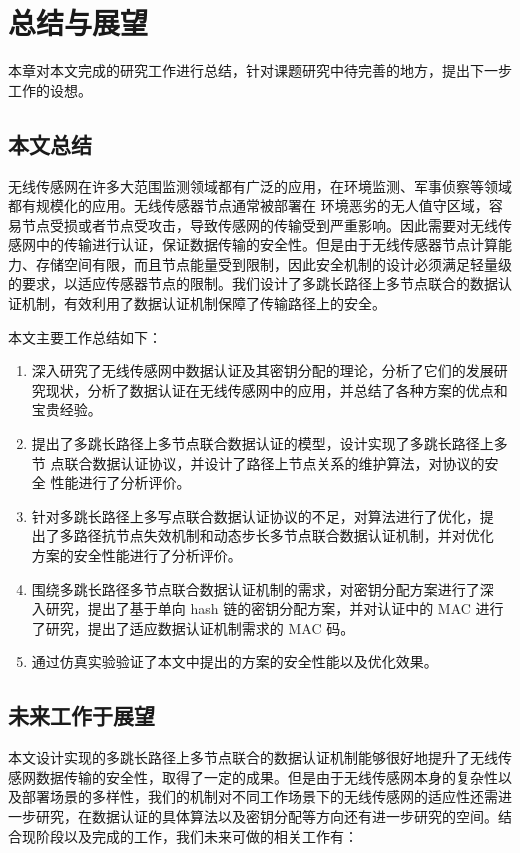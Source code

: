 \chapter{总结与展望}
本章对本文完成的研究工作进行总结，针对课题研究中待完善的地方，提出下一步工作的设想。
\section{本文总结}
无线传感网在许多大范围监测领域都有广泛的应用，在环境监测、军事侦察等领域都有规模化的应用。无线传感器节点通常被部署在
环境恶劣的无人值守区域，容易节点受损或者节点受攻击，导致传感网的传输受到严重影响。因此需要对无线传感网中的传输进行认证，保证数据传输的安全性。但是由于无线传感器节点计算能力、存储空间有限，而且节点能量受到限制，因此安全机制的设计必须满足轻量级的要求，以适应传感器节点的限制。我们设计了多跳长路径上多节点联合的数据认证机制，有效利用了数据认证机制保障了传输路径上的安全。

本文主要工作总结如下：
\begin{enumerate}\setlength{\itemsep}{-\itemsep}
  \item 深入研究了无线传感网中数据认证及其密钥分配的理论，分析了它们的发展研究现状，分析了数据认证在无线传感网中的应用，并总结了各种方案的优点和宝贵经验。
  \item 提出了多跳长路径上多节点联合数据认证的模型，设计实现了多跳长路径上多节
        点联合数据认证协议，并设计了路径上节点关系的维护算法，对协议的安全
        性能进行了分析评价。
  \item 针对多跳长路径上多写点联合数据认证协议的不足，对算法进行了优化，提
        出了多路径抗节点失效机制和动态步长多节点联合数据认证机制，并对优化
        方案的安全性能进行了分析评价。
  \item 围绕多跳长路径多节点联合数据认证机制的需求，对密钥分配方案进行了深
        入研究，提出了基于单向 hash 链的密钥分配方案，并对认证中的 MAC 进行
        了研究，提出了适应数据认证机制需求的 MAC 码。
  \item 通过仿真实验验证了本文中提出的方案的安全性能以及优化效果。
\end{enumerate}



\section{未来工作于展望}
本文设计实现的多跳长路径上多节点联合的数据认证机制能够很好地提升了无线传感网数据传输的安全性，取得了一定的成果。但是由于无线传感网本身的复杂性以及部署场景的多样性，我们的机制对不同工作场景下的无线传感网的适应性还需进一步研究，在数据认证的具体算法以及密钥分配等方向还有进一步研究的空间。结合现阶段以及完成的工作，我们未来可做的相关工作有：


